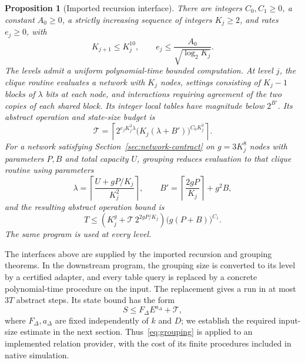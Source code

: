 \documentclass[11pt,reqno]{amsart}
\numberwithin{equation}{section}
\newtheorem{proposition}[theorem]{Proposition}
\theoremstyle{definition}
\theoremstyle{remark}
\begin{document}
\begin{proposition}[Imported recursion interface]\label{prop:backend}
There are integers $C_0,C_1\ge0$, a constant $A_0\ge0$, a strictly increasing sequence of integers $K_j\ge2$, and rates $e_j\ge0$, with
\begin{equation}\label{eq:levels}
 K_{j+1}\le K_j^{10},\qquad
 e_j\le\frac{A_0}{\sqrt{\log_2K_j}}.
\end{equation}
The levels admit a uniform polynomial-time bounded computation. At level $j$, the clique routine evaluates a network with $K_j$ nodes, settings consisting of $K_j-1$ blocks of $\lambda$ bits at each node, and interactions requiring agreement of the two copies of each shared block. Its integer local tables have magnitude below $2^{B'}$. Its abstract operation and state-size budget is
\begin{equation}\label{eq:clique-budget}
 \mathcal T=
 \left\lceil
  2^{e_jK_j^2\lambda}
  \bigl(K_j(\lambda+B')\bigr)^{C_0K_j^2}
 \right\rceil.
\end{equation}
For a network satisfying Section~\ref{sec:network-contract} on $g=3K_j^8$ nodes with parameters $P,B$ and total capacity $U$, grouping reduces evaluation to that clique routine using parameters
\begin{equation}\label{eq:clique-parameters}
 \lambda=\left\lceil\frac{U+gP/K_j}{K_j^2}\right\rceil,
 \qquad
 B'=\left\lceil\frac{2gP}{K_j}\right\rceil+g^2B,
\end{equation}
and the resulting abstract operation bound is
\begin{equation}\label{eq:grouping}
 T\le
 \left(K_j^g+\mathcal T\,2^{2gP/K_j}\right)
 \bigl(g(P+B)\bigr)^{C_1}.
\end{equation}
The same program is used at every level.
\end{proposition}

The interfaces above are supplied by the imported recursion and grouping theorems. In the downstream program, the grouping size is converted to its level by a certified adapter, and every table query is replaced by a concrete polynomial-time procedure on the input. The replacement gives a run in at most $3T$ abstract steps. Its state bound has the form
\begin{equation}\label{eq:state-shape}
 S\le F_\Delta E^{a_\Delta}+\mathcal T,
\end{equation}
where $F_\Delta,a_\Delta$ are fixed independently of $k$ and $D$; we establish the required input-size estimate in the next section. Thus~\eqref{eq:grouping} is applied to an implemented relation provider, with the cost of its finite procedures included in native simulation.
\end{document}
